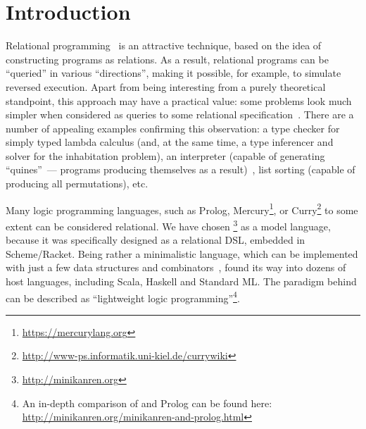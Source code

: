 \section{Introduction}
\label{intro}

Relational programming~\cite{TRS} is an attractive technique, based on the idea 
of constructing programs as relations.  As a result, relational programs can be
``queried'' in various ``directions'', making it possible, for example, to simulate
reversed execution. Apart from being interesting from a purely theoretical standpoint, 
this approach may have a practical value: some problems look much simpler 
when considered as queries to some relational specification~\cite{WillThesis}. There are a 
number of appealing examples confirming this observation: a type checker 
for simply typed lambda calculus (and, at the same time, a type inferencer and solver 
for the inhabitation problem), an interpreter (capable of generating ``quines''~--- 
programs producing themselves as a result)~\cite{Untagged}, list sorting (capable of 
producing all permutations), etc. 

Many logic programming languages, such as Prolog, Mercury\footnote{\url{https://mercurylang.org}}, 
or Curry\footnote{\url{http://www-ps.informatik.uni-kiel.de/currywiki}} to some extent
can be considered relational. We have chosen \miniKanren\footnote{\url{http://minikanren.org}} 
as a model language, because it was specifically designed as a relational DSL, embedded in Scheme/Racket. 
Being rather a minimalistic language, which can be implemented with just a few data structures and
combinators~\cite{MicroKanren, MuKanrenNew}, \miniKanren found its way into dozens of host languages, including Scala, Haskell and Standard ML.
The paradigm behind \miniKanren can be described as ``lightweight logic programming''\footnote{An in-depth comparison of \miniKanren 
and Prolog can be found here: \url{http://minikanren.org/minikanren-and-prolog.html}}.

